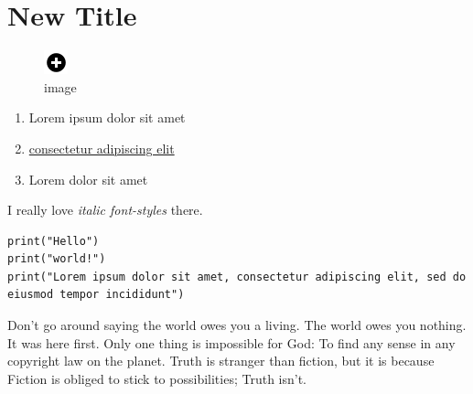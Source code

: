 \hypertarget{new-title}{%
\section{New Title}\label{new-title}}

\begin{figure}
\centering
\includegraphics{plus.png}
\caption{image}
\end{figure}

\begin{enumerate}
\def\labelenumi{\arabic{enumi}.}
\tightlist
\item
  Lorem ipsum dolor sit amet
\item
  \href{https://en.wikipedia.org/wiki/Lorem_ipsum}{consectetur
  adipiscing elit}
\item
  Lorem dolor sit amet
\end{enumerate}

I really love \emph{italic font-styles} there.

\begin{verbatim}
print("Hello")
print("world!")
print("Lorem ipsum dolor sit amet, consectetur adipiscing elit, sed do eiusmod tempor incididunt")
\end{verbatim}

Don't go around saying the world owes you a living. The world owes you
nothing. It was here first. Only one thing is impossible for God: To
find any sense in any copyright law on the planet. Truth is stranger
than fiction, but it is because Fiction is obliged to stick to
possibilities; Truth isn't.

